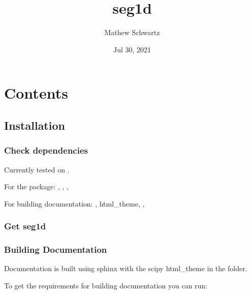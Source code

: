 \documentclass[letterpaper,10pt,english]{sphinxmanual}
\title{seg1d}
\date{Jul 30, 2021}
\author{Mathew Schwartz}
\begin{document}
\pagestyle{empty}
\sphinxmaketitle
\pagestyle{plain}
\sphinxtableofcontents
\pagestyle{normal}
\label{\detokenize{index::doc}}



\chapter{Contents}
\label{\detokenize{index:contents}}

\section{Installation}
\label{\detokenize{install:installation}}\label{\detokenize{install::doc}}

\subsection{Check dependencies}
\label{\detokenize{install:check-dependencies}}
\sphinxAtStartPar
Currently tested on .

\sphinxAtStartPar
For the package: , , , 

\sphinxAtStartPar
For building documentation: ,  html\_theme, , 


\subsection{Get seg1d}
\label{\detokenize{install:get-seg1d}}
\sphinxAtStartPar
{}


\subsection{Building Documentation}
\label{\detokenize{install:building-documentation}}
\sphinxAtStartPar
Documentation is built using sphinx with the scipy html\_theme in the  folder.

\sphinxAtStartPar
To get the requirements for building documentation you can run:

\sphinxAtStartPar
{}
\end{document}
